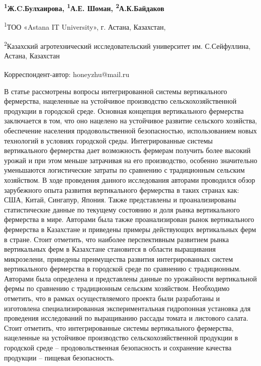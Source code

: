 
\begin{articleheader}

{\bfseries
\textsuperscript{1}Ж.C.Булхаирова\textsuperscript{\envelope },
\textsuperscript{1}А.Е. Шоман,
\textsuperscript{2}А.К.Байдаков
}
\end{articleheader}

\begin{affiliation}
\textsuperscript{1}ТОО «Astana IT University», г. Астана, Казахстан,

\textsuperscript{2}Казахский агротехнический исследовательский университет им. С.Сейфуллина, Астана, Казахстан

\raggedright \textsuperscript{\envelope }Корреспондент-автор: honeyzhu@mail.ru
\end{affiliation}

В статье рассмотрены вопросы интегрированной системы вертикального
фермерства, нацеленные на устойчивое производство сельскохозяйственной
продукции в городской среде. Основная концепция вертикального фермерства
заключается в том, что оно нацелено на устойчивое развитие сельского
хозяйства, обеспечение населения продовольственной безопасностью,
использованием новых технологий в условиях городской среды.
Интегрированные системы вертикального фермерства дает возможность
фермерам получить более высокий урожай и при этом меньше затрачивая на
его производство, особенно значительно уменьшаются логистические затраты
по сравнению с традиционным сельским хозяйством. В ходе проведения
данного исследования авторами проводился обзор зарубежного опыта
развития вертикального фермерства в таких странах как: США, Китай,
Сингапур, Япония. Также представлены и проанализированы статистические
данные по текущему состоянию и доля рынка вертикального фермерства в
мире. Авторами была также проанализирован рынок вертикального фермерства
в Казахстане и приведены примеры действующих вертикальных ферм в стране.
Стоит отметить, что наиболее перспективным развитием рынка вертикальных
ферм в Казахстане становится в области выращивания микрозелени,
приведены преимущества развития интегрированных систем вертикального
фермерства в городской среде по сравнению с традиционным. Авторами была
определена и представлены данные по урожайности вертикальной фермы по
сравнению с традиционным сельским хозяйством. Необходимо отметить, что в
рамках осуществляемого проекта были разработаны и изготовлена
специализированная экспериментальная гидропонная установка для
проведения исследований по выращиванию рассады томата и листового
салата. Стоит отметить, что интегрированные системы вертикального
фермерства, нацеленные на устойчивое производство сельскохозяйственной
продукции в городской среде -- продовольственная безопасность и
сохранение качества продукции -- пищевая безопасность.

